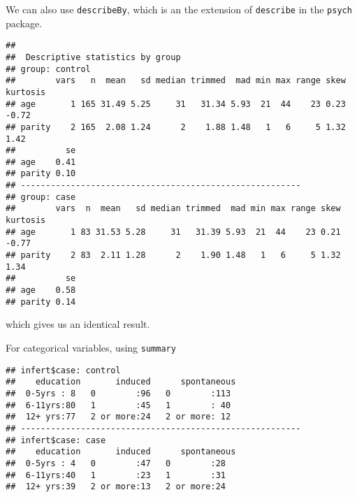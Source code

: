 \documentclass[]{book}
\newenvironment{Shaded}{\begin{snugshade}}{\end{snugshade}}
\newcommand{\KeywordTok}[1]{\textcolor[rgb]{0.13,0.29,0.53}{\textbf{{#1}}}}
\newcommand{\DataTypeTok}[1]{\textcolor[rgb]{0.13,0.29,0.53}{{#1}}}
\newcommand{\StringTok}[1]{\textcolor[rgb]{0.31,0.60,0.02}{{#1}}}
\newcommand{\NormalTok}[1]{{#1}}
\theoremstyle{definition}
\theoremstyle{definition}
\theoremstyle{remark}
\begin{document}
We can also use \texttt{describeBy}, which is an the extension of
\texttt{describe} in the \texttt{psych} package.

\begin{Shaded}
\end{Shaded}

\begin{verbatim}
## 
##  Descriptive statistics by group 
## group: control
##        vars   n  mean   sd median trimmed  mad min max range skew kurtosis
## age       1 165 31.49 5.25     31   31.34 5.93  21  44    23 0.23    -0.72
## parity    2 165  2.08 1.24      2    1.88 1.48   1   6     5 1.32     1.42
##          se
## age    0.41
## parity 0.10
## -------------------------------------------------------- 
## group: case
##        vars  n  mean   sd median trimmed  mad min max range skew kurtosis
## age       1 83 31.53 5.28     31   31.39 5.93  21  44    23 0.21    -0.77
## parity    2 83  2.11 1.28      2    1.90 1.48   1   6     5 1.32     1.34
##          se
## age    0.58
## parity 0.14
\end{verbatim}

which gives us an identical result.

For categorical variables, using \texttt{summary}

\begin{Shaded}
\end{Shaded}

\begin{verbatim}
## infert$case: control
##    education       induced      spontaneous 
##  0-5yrs : 8   0        :96   0        :113  
##  6-11yrs:80   1        :45   1        : 40  
##  12+ yrs:77   2 or more:24   2 or more: 12  
## -------------------------------------------------------- 
## infert$case: case
##    education       induced      spontaneous
##  0-5yrs : 4   0        :47   0        :28  
##  6-11yrs:40   1        :23   1        :31  
##  12+ yrs:39   2 or more:13   2 or more:24
\end{verbatim}
\end{document}
